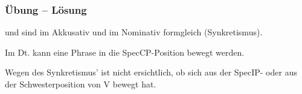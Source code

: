 
\begin{frame}
\frametitle{Übung -- Lösung}


\begin{minipage}[b]{0.29\textwidth}
	\centering
\end{minipage}
%
%
\begin{minipage}[b]{0.31\textwidth}
	\centering
\end{minipage}
\begin{minipage}[b]{.38\textwidth}


\begin{itemize*}
	\item {\small {} und  sind im Akkusativ und im Nominativ formgleich (Synkretismus).}
	\item {\small Im Dt. kann eine Phrase in die SpecCP-Position bewegt werden.}
	\item {\small Wegen des Synkretismus' ist nicht ersichtlich, ob  sich aus der SpecIP- oder aus der Schwesterposition von V bewegt hat. }
\end{itemize*}

\end{minipage}
\end{frame}
